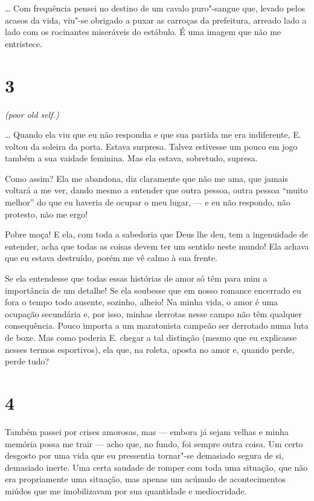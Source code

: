 \ldots{} Com frequência pensei no destino de um cavalo puro"-sangue que,
levado pelos acasos da vida, viu"-se obrigado a puxar as carroças da
prefeitura, arreado lado a lado com os rocinantes miseráveis do
estábulo. É uma imagem que não me entristece.

\section{3}


\emph{(poor old self.)}

\ldots{} Quando ela viu que eu não respondia e que sua partida me era
indiferente, E. voltou da soleira da porta. Estava surpresa. Talvez
estivesse um pouco em jogo também a sua vaidade feminina. Mas ela
estava, sobretudo, supresa.

Como assim? Ela me abandona, diz claramente que não me ama, que jamais
voltará a me ver, dando mesmo a entender que outra pessoa, outra pessoa
``muito melhor'' do que eu haveria de ocupar o meu lugar, --- e eu não
respondo, não protesto, não me ergo!

Pobre moça! E ela, com toda a sabedoria que Deus lhe deu, tem a
ingenuidade de entender, acha que todas as coisas devem ter um sentido
neste mundo! Ela achava que eu estava destruído, porém me vê calmo à sua
frente.

Se ela entendesse que todas essas histórias de amor só têm para mim a
importância de um detalhe! Se ela soubesse que em nosso romance
encerrado eu fora o tempo todo ausente, sozinho, alheio! Na minha vida,
o amor é uma ocupação secundária e, por isso, minhas derrotas nesse
campo não têm qualquer consequência. Pouco importa a um maratonista
campeão ser derrotado numa luta de boxe. Mas como poderia E. chegar a
tal distinção (mesmo que eu explicasse nesses termos esportivos), ela
que, na roleta, aposta no amor e, quando perde, perde tudo?

\section{4}

Também passei por crises amorosas, mas --- embora já sejam velhas e minha
memória possa me trair --- acho que, no fundo, foi sempre outra coisa. Um
certo desgosto por uma vida que eu pressentia tornar"-se demasiado segura
de si, demasiado inerte. Uma certa saudade de romper com toda uma
situação, que não era propriamente uma situação, mas apenas um acúmulo
de acontecimentos miúdos que me imobilizavam por sua quantidade e
mediocridade.

